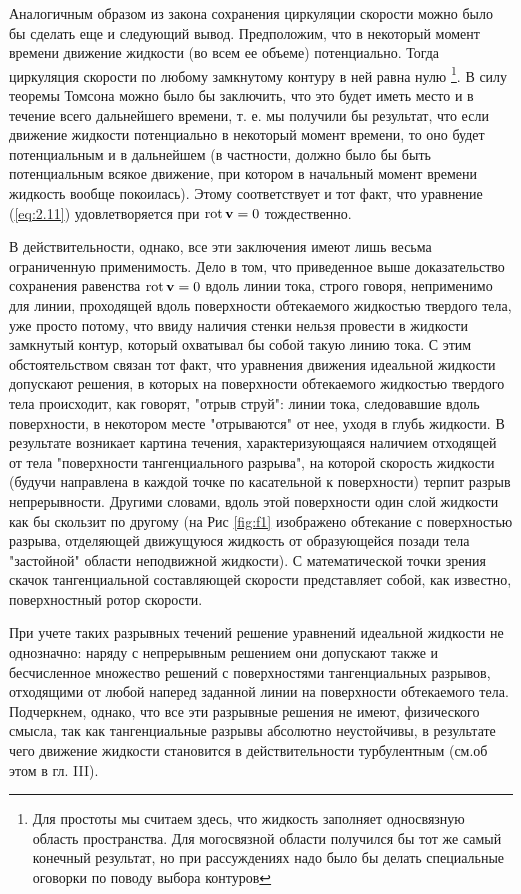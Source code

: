 Аналогичным образом из закона сохранения циркуляции скорости можно было бы
сделать еще и следующий вывод. Предположим, что в некоторый момент времени
движение жидкости (во всем ее объеме) потенциально. Тогда циркуляция скорости по
любому замкнутому контуру в ней равна нулю \footnote{Для простоты мы считаем здесь,
что жидкость заполняет односвязную область пространства. Для могосвязной области
получился бы тот же самый конечный результат, но при рассуждениях надо было бы делать
специальные оговорки по поводу выбора контуров}. В силу теоремы Томсона можно было бы
заключить, что это будет иметь место и в течение всего дальнейшего времени, т.
е. мы получили бы результат, что если движение жидкости потенциально в некоторый
момент времени, то оно будет потенциальным и в дальнейшем (в частности, должно
было бы быть потенциальным всякое движение, при котором в начальный момент
времени жидкость вообще покоилась). Этому соответствует и тот факт, что
уравнение (\ref{eq:2.11}) удовлетворяется при $\mathop{\mathrm{rot}}\nolimits{ \mathbf{v} } = 0$ тождественно.


В действительности, однако, все эти заключения имеют лишь весьма ограниченную
применимость. Дело в том, что приведенное выше доказательство сохранения
равенства $\mathop{\mathrm{rot}}\nolimits{ \mathbf{v} } = 0$ вдоль линии тока, строго говоря, неприменимо для линии,
проходящей вдоль поверхности обтекаемого жидкостью твердого тела, уже просто
потому, что ввиду наличия стенки нельзя провести в жидкости замкнутый контур,
который охватывал бы собой такую линию тока. С этим обстоятельством связан тот
факт, что уравнения движения идеальной жидкости допускают решения, в которых на
поверхности обтекаемого жидкостью твердого тела происходит, как говорят, "отрыв
струй": линии тока, следовавшие вдоль поверхности, в некотором месте
"отрываются" от нее, уходя в глубь жидкости. В результате возникает картина
течения, характеризующаяся наличием отходящей от тела "поверхности
тангенциального разрыва", на которой скорость жидкости (будучи направлена в
каждой точке по касательной к поверхности) терпит разрыв непрерывности. Другими
словами, вдоль этой поверхности один слой жидкости как бы скользит по другому
(на Рис \ref{fig:f1} изображено обтекание с поверхностью разрыва, отделяющей движущуюся
жидкость от образующейся позади тела "застойной" области неподвижной жидкости).
С математической точки зрения скачок тангенциальной составляющей скорости
представляет собой, как известно, поверхностный ротор скорости.

При учете таких разрывных течений решение уравнений идеальной жидкости не
однозначно: наряду с непрерывным решением они допускают также и бесчисленное
множество решений с поверхностями тангенциальных разрывов, отходящими от любой
наперед заданной линии на поверхности обтекаемого тела. Подчеркнем, однако, что
все эти разрывные решения не имеют, физического смысла, так как тангенциальные
разрывы абсолютно неустойчивы, в результате чего движение жидкости становится в
действительности турбулентным (см.об этом в гл. III).

